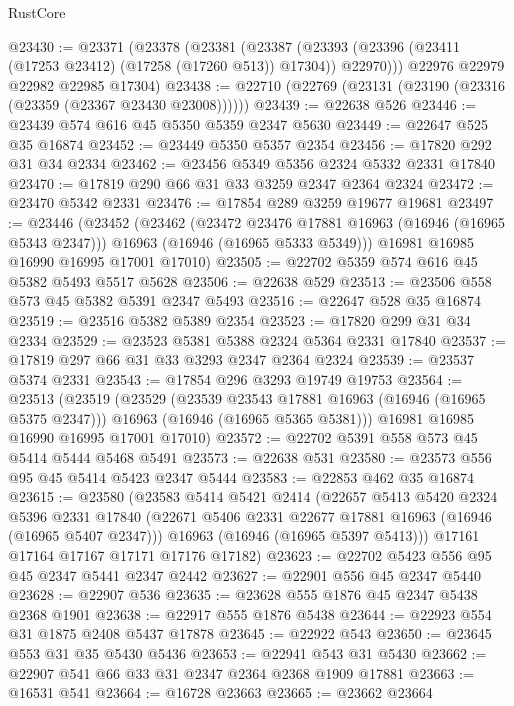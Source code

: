 \begin{lexlean}{RustCore}
\begin{coremodule}
@23430 := @23371
    (@23378
      (@23381
        (@23387 (@23393 (@23396 (@23411 (@17253 @23412) (@17258 (@17260 @513)) @17304)) @22970)))
      @22976
      @22979
      @22982
      @22985
      @17304)
@23438 := @22710 (@22769 (@23131 (@23190 (@23316 (@23359 (@23367 @23430 @23008))))))
@23439 := @22638 @526
@23446 := @23439 @574 @616 @45 @5350 @5359 @2347 @5630
@23449 := @22647 @525 @35 @16874
@23452 := @23449 @5350 @5357 @2354
@23456 := @17820 @292 @31 @34 @2334
@23462 := @23456 @5349 @5356 @2324 @5332 @2331 @17840
@23470 := @17819 @290 @66 @31 @33 @3259 @2347 @2364 @2324
@23472 := @23470 @5342 @2331
@23476 := @17854 @289 @3259 @19677 @19681
@23497 := @23446
    (@23452
      (@23462
        (@23472 @23476 @17881 @16963 (@16946 (@16965 @5343 @2347)))
        @16963
        (@16946 (@16965 @5333 @5349)))
      @16981
      @16985
      @16990
      @16995
      @17001
      @17010)
@23505 := @22702 @5359 @574 @616 @45 @5382 @5493 @5517 @5628
@23506 := @22638 @529
@23513 := @23506 @558 @573 @45 @5382 @5391 @2347 @5493
@23516 := @22647 @528 @35 @16874
@23519 := @23516 @5382 @5389 @2354
@23523 := @17820 @299 @31 @34 @2334
@23529 := @23523 @5381 @5388 @2324 @5364 @2331 @17840
@23537 := @17819 @297 @66 @31 @33 @3293 @2347 @2364 @2324
@23539 := @23537 @5374 @2331
@23543 := @17854 @296 @3293 @19749 @19753
@23564 := @23513
    (@23519
      (@23529
        (@23539 @23543 @17881 @16963 (@16946 (@16965 @5375 @2347)))
        @16963
        (@16946 (@16965 @5365 @5381)))
      @16981
      @16985
      @16990
      @16995
      @17001
      @17010)
@23572 := @22702 @5391 @558 @573 @45 @5414 @5444 @5468 @5491
@23573 := @22638 @531
@23580 := @23573 @556 @95 @45 @5414 @5423 @2347 @5444
@23583 := @22853 @462 @35 @16874
@23615 := @23580
    (@23583
      @5414
      @5421
      @2414
      (@22657
        @5413
        @5420
        @2324
        @5396
        @2331
        @17840
        (@22671 @5406 @2331 @22677 @17881 @16963 (@16946 (@16965 @5407 @2347)))
        @16963
        (@16946 (@16965 @5397 @5413)))
      @17161
      @17164
      @17167
      @17171
      @17176
      @17182)
@23623 := @22702 @5423 @556 @95 @45 @2347 @5441 @2347 @2442
@23627 := @22901 @556 @45 @2347 @5440
@23628 := @22907 @536
@23635 := @23628 @555 @1876 @45 @2347 @5438 @2368 @1901
@23638 := @22917 @555 @1876 @5438
@23644 := @22923 @554 @31 @1875 @2408 @5437 @17878
@23645 := @22922 @543
@23650 := @23645 @553 @31 @35 @5430 @5436
@23653 := @22941 @543 @31 @5430
@23662 := @22907 @541 @66 @33 @31 @2347 @2364 @2368 @1909 @17881
@23663 := @16531 @541
@23664 := @16728 @23663
@23665 := @23662 @23664

\end{coremodule}
\end{lexlean}
